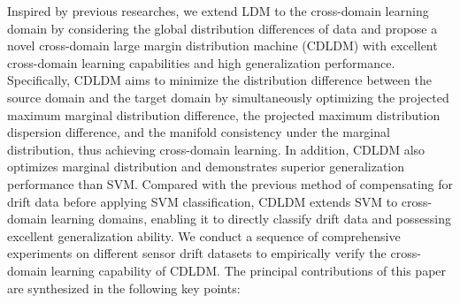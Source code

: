 \documentclass[a4paper]{cas-sc}
\begin{document}
Inspired by previous researches, we extend LDM to the cross-domain learning domain by considering the global distribution differences of data and propose a novel cross-domain large margin distribution machine (CDLDM) with excellent cross-domain learning capabilities and high generalization performance. 
Specifically, CDLDM aims to minimize the distribution difference between the source domain and the target domain by simultaneously optimizing the projected maximum marginal distribution difference, the projected maximum distribution dispersion difference, and the manifold consistency under the marginal distribution, thus achieving cross-domain learning. In addition, CDLDM also optimizes marginal distribution and demonstrates superior generalization performance than SVM.
Compared with the previous method of compensating for drift data before applying SVM classification, CDLDM extends SVM to cross-domain learning domains, enabling it to directly classify drift data and possessing excellent generalization ability.
We conduct a sequence of comprehensive experiments on different sensor drift datasets to empirically verify the cross-domain learning capability of CDLDM. The principal contributions of this paper are synthesized in the following key points:
\end{document}
